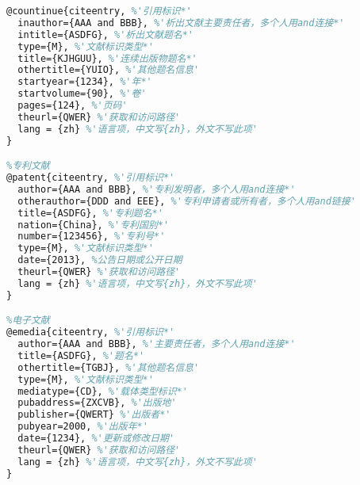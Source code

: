 \begin{lstlisting}[language=tex,escapeinside='',frame=single]
%连续出版物中的析出文献
@countinue{citeentry, %'引用标识*'
  inauthor={AAA and BBB}, %'析出文献主要责任者，多个人用and连接*'
  intitle={ASDFG}, %'析出文献题名*'
  type={M}, %'文献标识类型*'
  title={KJHGUU}, %'连续出版物题名*'
  othertitle={YUIO}, %'其他题名信息'
  startyear={1234}, %'年*'
  startvolume={90}, %'卷'
  pages={124}, %'页码'
  theurl={QWER} %'获取和访问路径'
  lang = {zh} %'语言项，中文写{zh}，外文不写此项'
}

%专利文献
@patent{citeentry, %'引用标识*'
  author={AAA and BBB}, %'专利发明者，多个人用and连接*'
  otherauthor={DDD and EEE}, %'专利申请者或所有者，多个人用and链接'
  title={ASDFG}, %'专利题名*'
  nation={China}, %'专利国别*'
  number={123456}, %'专利号*'
  type={M}, %'文献标识类型*'
  date={2013}, %公告日期或公开日期
  theurl={QWER} %'获取和访问路径'
  lang = {zh} %'语言项，中文写{zh}，外文不写此项'
}

%电子文献
@emedia{citeentry, %'引用标识*'
  author={AAA and BBB}, %'主要责任者，多个人用and连接*'
  title={ASDFG}, %'题名*'
  othertitle={TGBJ}, %'其他题名信息'
  type={M}, %'文献标识类型*'
  mediatype={CD}, %'载体类型标识*'
  pubaddress={ZXCVB}, %'出版地'
  publisher={QWERT} %'出版者*'
  pubyear=2000, %'出版年*'
  date={1234}, %'更新或修改日期'
  theurl={QWER} %'获取和访问路径'
  lang = {zh} %'语言项，中文写{zh}，外文不写此项'
}

\end{lstlisting}
